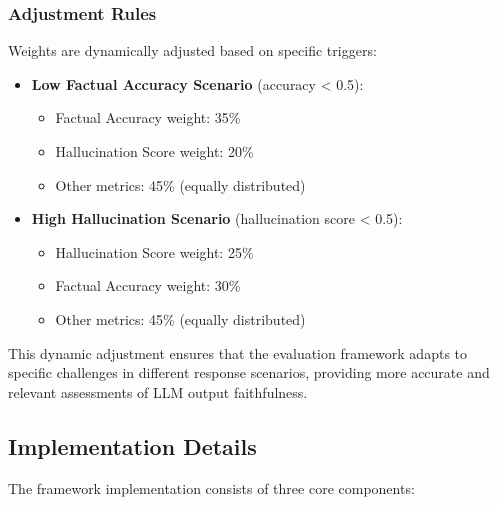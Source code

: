\subsubsection{Adjustment Rules}
Weights are dynamically adjusted based on specific triggers:

\begin{itemize}
    \item \textbf{Low Factual Accuracy Scenario} (accuracy < 0.5):
    \begin{itemize}
        \item Factual Accuracy weight: 35\%
        \item Hallucination Score weight: 20\%
        \item Other metrics: 45\% (equally distributed)
    \end{itemize}
    
    \item \textbf{High Hallucination Scenario} (hallucination score < 0.5):
    \begin{itemize}
        \item Hallucination Score weight: 25\%
        \item Factual Accuracy weight: 30\%
        \item Other metrics: 45\% (equally distributed)
    \end{itemize}
\end{itemize}

This dynamic adjustment ensures that the evaluation framework adapts to specific challenges in different response scenarios, providing more accurate and relevant assessments of LLM output faithfulness.

\subsection{Implementation Details}
The framework implementation consists of three core components:

